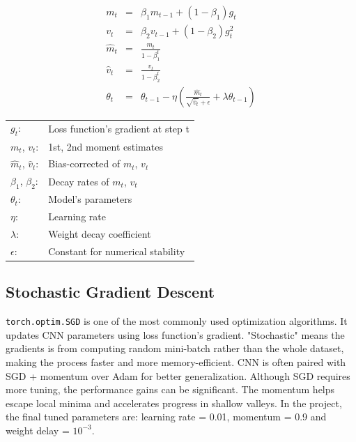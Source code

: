 \documentclass{report}
\begin{document}
\[
\begin{array}{rcl}
    m_t       & = & \beta_1 m_{t-1} + (1 - \beta_1) g_t                                 \\ [0.2cm]
    v_t       & = & \beta_2 v_{t-1} + (1 - \beta_2) g_t^2                               \\ [0.2cm]
    \hat{m}_t & = & \frac{m_t}{1 - \beta_1^t}                                           \\ [0.2cm]
    \hat{v}_t & = & \frac{v_t}{1 - \beta_2^t}                                           \\ [0.2cm]
    \theta_t  & = & \theta_{t-1} - \eta \left( \frac{\hat{m}_t}{\sqrt{\hat{v}_t} 
                    + \epsilon} + \lambda \theta_{t-1} \right)                             
\end{array}
\]

\begin{center}
    \begin{tabular}{ll}
        $g_t$:                    & Loss function's gradient at step t  \\
        $m_t$, $v_t$:             & 1st, 2nd moment estimates           \\
        $\hat{m}_t$, $\hat{v}_t$: & Bias-corrected of $m_t$, $v_t$      \\
        $\beta_1$, $\beta_2$:     & Decay rates of $m_t$, $v_t$         \\
        $\theta_t$:               & Model's parameters                  \\
        $\eta$:                   & Learning rate                       \\
        $\lambda$:                & Weight decay coefficient            \\
        $\epsilon$:               & Constant for numerical stability    
    \end{tabular}   
\end{center}

\subsection{Stochastic Gradient Descent}
\texttt{torch.optim.SGD} is one of the most commonly used optimization algorithms. It updates CNN parameters
using loss function's gradient. "Stochastic" means the gradients is from computing random mini-batch rather 
than the whole dataset, making the process faster and more memory-efficient. CNN is often paired with SGD 
+ momentum over Adam for better generalization. Although SGD requires more tuning, the performance gains 
can be significant. The momentum helps escape local minima and accelerates progress in shallow valleys. In 
the project, the final tuned parameters are: learning rate = 0.01, momentum = 0.9 and weight delay = $10^{-3}$.
\end{document}

